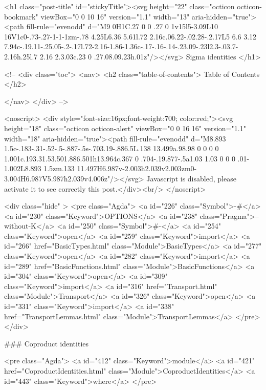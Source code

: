   <h1 class="post-title" id="stickyTitle"><svg height="22" class="octicon octicon-bookmark" viewBox="0 0 10 16" version="1.1" width="13" aria-hidden="true"><path fill-rule="evenodd" d="M9 0H1C.27 0 0 .27 0 1v15l5-3.09L10 16V1c0-.73-.27-1-1-1zm-.78 4.25L6.36 5.61l.72 2.16c.06.22-.02.28-.2.17L5 6.6 3.12 7.94c-.19.11-.25.05-.2-.17l.72-2.16-1.86-1.36c-.17-.16-.14-.23.09-.23l2.3-.03.7-2.16h.25l.7 2.16 2.3.03c.23 0 .27.08.09.23h.01z"/></svg> Sigma identities
  </h1>

  <!-- 
  <div class="toc">
    <nav>
    <h2 class="table-of-contents"> Table of Contents </h2>
      

    </nav>
  </div>
   -->

  <noscript>
  <div style="font-size:16px;font-weight:700; color:red;"><svg height="18" class="octicon octicon-alert" viewBox="0 0 16 16" version="1.1" width="18" aria-hidden="true"><path fill-rule="evenodd" d="M8.893 1.5c-.183-.31-.52-.5-.887-.5s-.703.19-.886.5L.138 13.499a.98.98 0 0 0 0 1.001c.193.31.53.501.886.501h13.964c.367 0 .704-.19.877-.5a1.03 1.03 0 0 0 .01-1.002L8.893 1.5zm.133 11.497H6.987v-2.003h2.039v2.003zm0-3.004H6.987V5.987h2.039v4.006z"/></svg> Javascript is disabled, please activate it to see correctly this post.</div><br/>
  </noscript>

  <div class="hide" >
<pre class="Agda">
<a id="226" class="Symbol">{-#</a> <a id="230" class="Keyword">OPTIONS</a> <a id="238" class="Pragma">--without-K</a> <a id="250" class="Symbol">#-}</a>
<a id="254" class="Keyword">open</a> <a id="259" class="Keyword">import</a> <a id="266" href="BasicTypes.html" class="Module">BasicTypes</a>
<a id="277" class="Keyword">open</a> <a id="282" class="Keyword">import</a> <a id="289" href="BasicFunctions.html" class="Module">BasicFunctions</a>
<a id="304" class="Keyword">open</a> <a id="309" class="Keyword">import</a> <a id="316" href="Transport.html" class="Module">Transport</a>
<a id="326" class="Keyword">open</a> <a id="331" class="Keyword">import</a> <a id="338" href="TransportLemmas.html" class="Module">TransportLemmas</a>
</pre>
</div>

### Coproduct identities

<pre class="Agda">
<a id="412" class="Keyword">module</a>
  <a id="421" href="CoproductIdentities.html" class="Module">CoproductIdentities</a>
  <a id="443" class="Keyword">where</a>
</pre>

